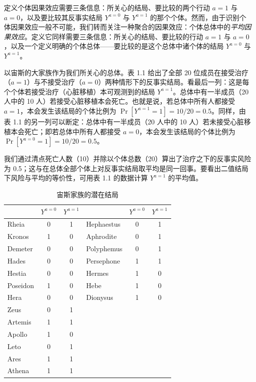 定义个体因果效应需要三条信息：所关心的结局、要比较的两个行动 $a=1$ 与 $a=0$，以及要比较其反事实结局 $Y^{a=0}$ 与 $Y^{a=1}$ 的那个个体。然而，由于识别个体因果效应一般不可能，我们转而关注一种聚合的因果效应：个体总体中的\emph{平均因果效应}。定义它同样需要三条信息：所关心的结局、要比较的行动 $a=1$ 与 $a=0$，以及一个定义明确的个体总体——要比较的是这个总体中诸个体的结局 $Y^{a=0}$ 与 $Y^{a=1}$。

以宙斯的大家族作为我们所关心的总体。表 1.1 给出了全部 20 位成员在接受治疗（$a=1$）与不接受治疗（$a=0$）两种情形下的反事实结局。看最后一列：这是每个个体若接受治疗（心脏移植）本可观测到的结局 $Y^{a=1}$。总体中有一半成员（20 人中的 10 人）若接受心脏移植本会死亡。也就是说，若总体中所有人都接受 $a=1$，本会发生该结局的个体比例为 $\Pr[Y^{a=1}=1]=10/20=0.5$。同样，由表 1.1 的另一列可以断定：总体中有一半成员（20 人中的 10 人）若未接受心脏移植本会死亡；即若总体中所有人都接受 $a=0$，本会发生该结局的个体比例为 $\Pr[Y^{a=0}=1]=10/20=0.5$。

我们通过清点死亡人数（10）并除以个体总数（20）算出了治疗之下的反事实风险为 0.5；这与在总体全部个体上对反事实结局取平均是同一回事。要看出二值结局下风险与平均的等价性，可用表 1.1 的数据计算 $Y^{a=1}$ 的平均值。

\begin{table}[htbp]
\centering
\caption{宙斯家族的潜在结局}
\label{tab:1.1}
\small
\begin{tabular}{lcc@{\hspace{2.5em}}lcc}
\toprule
& $Y^{a=0}$ & $Y^{a=1}$ & & $Y^{a=0}$ & $Y^{a=1}$\\
\midrule
Rheia      & 0 & 1 & Hephaestus & 0 & 1\\
Kronos     & 1 & 0 & Aphrodite  & 0 & 1\\
Demeter    & 0 & 0 & Polyphemus & 0 & 1\\
Hades      & 0 & 0 & Persephone & 1 & 1\\
Hestia     & 0 & 0 & Hermes     & 1 & 0\\
Poseidon   & 1 & 0 & Hebe       & 1 & 0\\
Hera       & 0 & 0 & Dionysus   & 1 & 0\\
Zeus       & 0 & 1 &            &   &  \\
Artemis    & 1 & 1 &            &   &  \\
Apollo     & 1 & 0 &            &   &  \\
Leto       & 0 & 1 &            &   &  \\
Ares       & 1 & 1 &            &   &  \\
Athena     & 1 & 1 &            &   &  \\
\bottomrule
\end{tabular}
\end{table}

